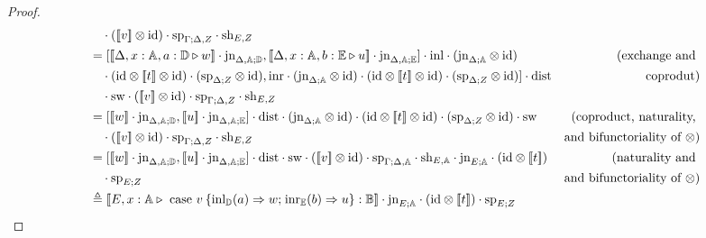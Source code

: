\documentclass[10pt,a4paper]{amsart}
\theoremstyle{definition}
\theoremstyle{definition}
\theoremstyle{definition}
\theoremstyle{definition}
\theoremstyle{definition}
\theoremstyle{definition}
\begin{document}
\begin{proof}
\begin{align*}
  &  \hspace{10pt} \cdot ([\![v]\!] \otimes \text{id})  \cdot \text{sp}_{\Gamma; \Delta, Z} \cdot \text{sh}_{E,Z} \\
  & = [[\![ \Delta  , x:\typeA ,  a:\typeD \vljud w]\!] \cdot \text{jn}_{\Delta, \typeA; \typeD}, [\![ \Delta  , x:\typeA ,  b:\typeE \vljud u]\!] \cdot \text{jn}_{\Delta, \typeA; \typeE}]  \cdot \inl  \cdot  (\text{jn}_{\Delta; \typeA} \otimes \text{id})     & {(\text{exchange and }}  \\
  & \hspace{10pt} \cdot (\text{id} \otimes [\![t]\!]  \otimes \text{id})  \cdot (\text{sp}_{\Delta; Z} \otimes \text{id}),\inr \cdot (\text{jn}_{\Delta; \typeA} \otimes \text{id})   \cdot (\text{id} \otimes [\![t]\!]  \otimes \text{id}) \cdot  (\text{sp}_{\Delta; Z} \otimes \text{id})] \cdot \text{dist}  & { \text{coprodut})}\\
  & \hspace{10pt} \cdot \text{sw} \cdot ([\![v]\!] \otimes \text{id})  \cdot \text{sp}_{\Gamma; \Delta, Z} \cdot \text{sh}_{E,Z} \\
  &= [[\![w]\!] \cdot \text{jn}_{\Delta, \typeA; \typeD}, [\![u]\!] \cdot \text{jn}_{\Delta, \typeA; \typeE}]  \cdot \text{dist} \cdot (\text{jn}_{\Delta; \typeA} \otimes \text{id})   \cdot (\text{id} \otimes [\![t]\!]  \otimes \text{id}) \cdot  (\text{sp}_{\Delta; Z} \otimes \text{id}) \cdot \text{sw}  & {(\text{coproduct, naturality, }}  \\
  & \hspace{10pt} \cdot ([\![v]\!] \otimes \text{id}) \cdot \text{sp}_{\Gamma; \Delta, Z} \cdot \text{sh}_{E,Z}  & {\text{and bifunctoriality of } \otimes})  \\
  & =  [[\![w]\!] \cdot \text{jn}_{\Delta, \typeA; \typeD}, [\![u]\!] \cdot \text{jn}_{\Delta, \typeA; \typeE}]  \cdot \text{dist} \cdot \text{sw}  \cdot ([\![v  ]\!] \otimes \text{id}) \cdot \text{sp}_{\Gamma; \Delta, \typeA} \cdot \text{sh}_{E,\typeA} \cdot \text{jn}_{E; \typeA} \cdot (\text{id} \otimes [\![ t  ]\!] ) & {(\text{naturality and  }} \\
  & \hspace{10pt} \cdot \text{sp}_{E;Z} &{\text{and bifunctoriality of } \otimes})  \\ 
  & \triangleq  [\![E,  x:\typeA \vljud \text{ case } v \hspace{2pt}  \{\text{inl}_{\typeD} (a) \Rightarrow w ; \hspace{1pt} \text{inr}_{\typeE} (b) \Rightarrow u\}: \typeB]\!] \cdot \text{jn}_{E; \typeA} \cdot (\text{id} \otimes [\![ t ]\!] ) \cdot \text{sp}_{E;Z}
\end{align*}
\end{proof}
\end{document}
